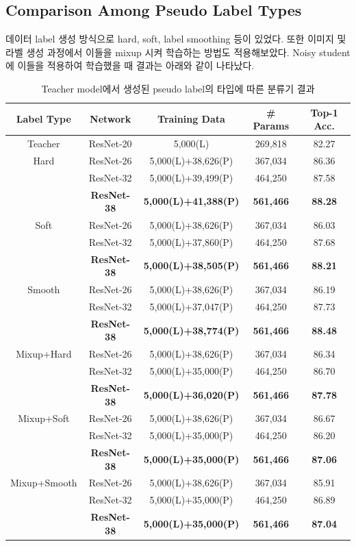 \documentclass[a4paper, 10pt]{article}
\begin{document}
\subsection{Comparison Among Pseudo Label Types}
데이터 label 생성 방식으로 hard, soft, label smoothing 등이 있었다. 또한 이미지
및 라벨 생성 과정에서 이들을 mixup 시켜 학습하는 방법도 적용해보았다. Noisy
student에 이들을 적용하여 학습했을 때 결과는 아래와 같이 나타났다.
\begin{table}[!h]
  \center
  \begin{tabular}{|c|c|c|c|c|}
\hline
Label Type & Network & Training Data & \# Params & Top-1 Acc. \\ \hline
Teacher & ResNet-20 & 5,000(L) & 269,818 & 82.27 \\ \hline
Hard & ResNet-26 & 5,000(L)+38,626(P) & 367,034 & 86.36 \\
     & ResNet-32 & 5,000(L)+39,499(P) & 464,250 & 87.58 \\
     & \textbf{ResNet-38} & \textbf{5,000(L)+41,388(P)}
& \textbf{561,466} & \textbf{88.28} \\ \hline

Soft & ResNet-26 & 5,000(L)+38,626(P) & 367,034 & 86.03 \\
     & ResNet-32 & 5,000(L)+37,860(P) & 464,250 & 87.68 \\
     & \textbf{ResNet-38} & \textbf{5,000(L)+38,505(P)}
& \textbf{561,466} & \textbf{88.21} \\ \hline

Smooth & ResNet-26 & 5,000(L)+38,626(P) & 367,034 & 86.19 \\
       & ResNet-32 & 5,000(L)+37,047(P) & 464,250 & 87.73 \\
       & \textbf{ResNet-38} & \textbf{5,000(L)+38,774(P)}
& \textbf{561,466} & \textbf{88.48} \\ \hline

Mixup+Hard & ResNet-26 & 5,000(L)+38,626(P) & 367,034 & 86.34 \\
           & ResNet-32 & 5,000(L)+35,000(P) & 464,250 & 86.70 \\
           & \textbf{ResNet-38} & \textbf{5,000(L)+36,020(P)}
& \textbf{561,466} & \textbf{87.78} \\ \hline

Mixup+Soft & ResNet-26 & 5,000(L)+38,626(P) & 367,034 & 86.67 \\
           & ResNet-32 & 5,000(L)+35,000(P) & 464,250 & 86.20 \\
           & \textbf{ResNet-38} & \textbf{5,000(L)+35,000(P)}
& \textbf{561,466} & \textbf{87.06} \\ \hline

Mixup+Smooth & ResNet-26 & 5,000(L)+38,626(P) & 367,034 & 85.91 \\
             & ResNet-32 & 5,000(L)+35,000(P) & 464,250 & 86.89 \\
             & \textbf{ResNet-38} & \textbf{5,000(L)+35,000(P)}
& \textbf{561,466} & \textbf{87.04} \\ \hline
  \end{tabular}
  \caption{Teacher model에서 생성된 pseudo label의 타입에 따른 분류기 결과}
  \label{labeltype}
\end{table}
\end{document}
